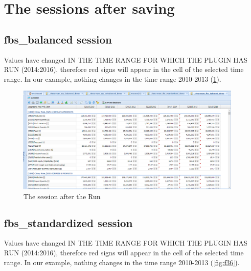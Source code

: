 \documentclass[]{article}
\begin{document}
\section{The sessions after saving}\label{the-sessions-after-saving}

\subsection{fbs\_balanced session}\label{fbs_balanced-session}

Values have changed IN THE TIME RANGE FOR WHICH THE PLUGIN HAS RUN
(2014:2016), therefore red signs will appear in the cell of the selected
time range. In our example, nothing changes in the time range 2010-2013
(\ref{fig:f35}).

\begin{figure}[H]

{\centering \includegraphics[width=1\linewidth]{images/standPlugin/35_finalSession} 

}

\caption{\label{fig:f35}The session after the Run}\label{fig:f35}
\end{figure}

\subsection{fbs\_standardized session}\label{fbs_standardized-session}

Values have changed IN THE TIME RANGE FOR WHICH THE PLUGIN HAS RUN
(2014:2016), therefore red signs will appear in the cell of the selected
time range. In our example, nothing changes in the time range 2010-2013
(\ref{fig:f36}).
\end{document}
